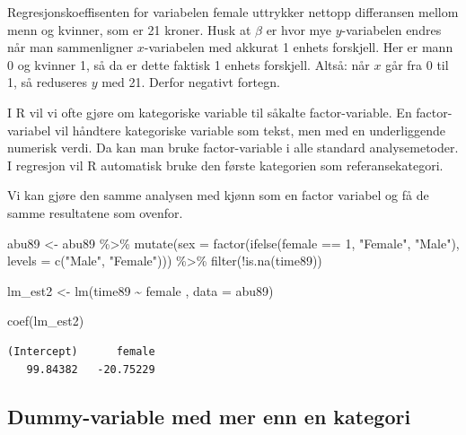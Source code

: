 \documentclass[
  norsk,
  letterpaper,
  DIV=11,
  numbers=noendperiod]{scrreprt}
\newenvironment{Shaded}{\begin{snugshade}}{\end{snugshade}}
\newcommand{\AttributeTok}[1]{\textcolor[rgb]{0.40,0.45,0.13}{#1}}
\newcommand{\DecValTok}[1]{\textcolor[rgb]{0.68,0.00,0.00}{#1}}
\newcommand{\FunctionTok}[1]{\textcolor[rgb]{0.28,0.35,0.67}{#1}}
\newcommand{\NormalTok}[1]{\textcolor[rgb]{0.00,0.23,0.31}{#1}}
\newcommand{\OtherTok}[1]{\textcolor[rgb]{0.00,0.23,0.31}{#1}}
\newcommand{\SpecialCharTok}[1]{\textcolor[rgb]{0.37,0.37,0.37}{#1}}
\newcommand{\StringTok}[1]{\textcolor[rgb]{0.13,0.47,0.30}{#1}}
\theoremstyle{definition}
\theoremstyle{remark}
\begin{document}
Regresjonskoeffisenten for variabelen female uttrykker nettopp
differansen mellom menn og kvinner, som er 21 kroner. Husk at \(\beta\)
er hvor mye \(y\)-variabelen endres når man sammenligner
\(x\)-variabelen med akkurat 1 enhets forskjell. Her er mann 0 og
kvinner 1, så da er dette faktisk 1 enhets forskjell. Altså: når \(x\)
går fra 0 til 1, så reduseres \(y\) med 21. Derfor negativt fortegn.

I R vil vi ofte gjøre om kategoriske variable til såkalte
factor-variable. En factor-variabel vil håndtere kategoriske variable
som tekst, men med en underliggende numerisk verdi. Da kan man bruke
factor-variable i alle standard analysemetoder. I regresjon vil R
automatisk bruke den første kategorien som referansekategori.

Vi kan gjøre den samme analysen med kjønn som en factor variabel og få
de samme resultatene som ovenfor.

\begin{Shaded}
\begin{Highlighting}[]
\NormalTok{abu89 }\OtherTok{\textless{}{-}}\NormalTok{ abu89 }\SpecialCharTok{\%\textgreater{}\%}
  \FunctionTok{mutate}\NormalTok{(}\AttributeTok{sex =} \FunctionTok{factor}\NormalTok{(}\FunctionTok{ifelse}\NormalTok{(female }\SpecialCharTok{==} \DecValTok{1}\NormalTok{, }\StringTok{"Female"}\NormalTok{, }\StringTok{"Male"}\NormalTok{), }\AttributeTok{levels =} \FunctionTok{c}\NormalTok{(}\StringTok{"Male"}\NormalTok{, }\StringTok{"Female"}\NormalTok{))) }\SpecialCharTok{\%\textgreater{}\%} 
  \FunctionTok{filter}\NormalTok{(}\SpecialCharTok{!}\FunctionTok{is.na}\NormalTok{(time89))}

\NormalTok{lm\_est2 }\OtherTok{\textless{}{-}} \FunctionTok{lm}\NormalTok{(time89 }\SpecialCharTok{\textasciitilde{}}\NormalTok{ female , }\AttributeTok{data =}\NormalTok{ abu89)}

\FunctionTok{coef}\NormalTok{(lm\_est2)}
\end{Highlighting}
\end{Shaded}

\begin{verbatim}
(Intercept)      female 
   99.84382   -20.75229 
\end{verbatim}

\subsection{Dummy-variable med mer enn en
kategori}\label{dummy-variable-med-mer-enn-en-kategori}
\end{document}
